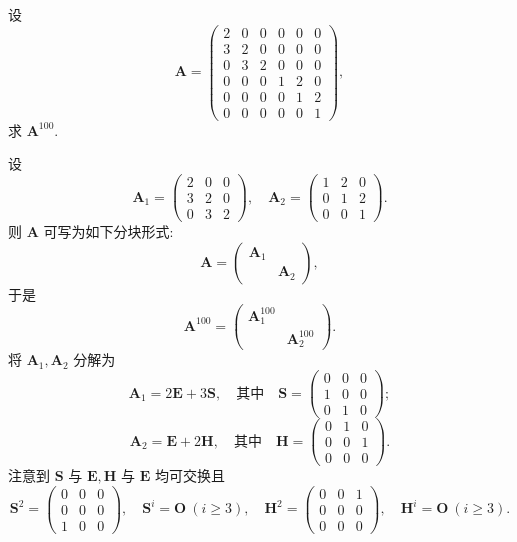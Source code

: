 \documentclass[../../main.tex]{subfiles}
\begin{document}
\begin{example}
设
\[
\boldsymbol{A} = \begin{pmatrix} 2 & 0 & 0 & 0 & 0 & 0 \\ 3 & 2 & 0 & 0 & 0 & 0 \\ 0 & 3 & 2 & 0 & 0 & 0 \\ 0 & 0 & 0 & 1 & 2 & 0 \\ 0 & 0 & 0 & 0 & 1 & 2 \\ 0 & 0 & 0 & 0 & 0 & 1 \end{pmatrix},
\]
求 \(\boldsymbol{A}^{100}\).
\end{example}
\begin{solution}
设
\[
\boldsymbol{A}_1 = \begin{pmatrix} 2 & 0 & 0 \\ 3 & 2 & 0 \\ 0 & 3 & 2 \end{pmatrix}, \quad \boldsymbol{A}_2 = \begin{pmatrix} 1 & 2 & 0 \\ 0 & 1 & 2 \\ 0 & 0 & 1 \end{pmatrix}.
\]
则 \(\boldsymbol{A}\) 可写为如下分块形式:
\[
\boldsymbol{A} = \begin{pmatrix} \boldsymbol{A}_1 &  \\  & \boldsymbol{A}_2 \end{pmatrix},
\]
于是
\[
\boldsymbol{A}^{100} = \begin{pmatrix} \boldsymbol{A}_1^{100} &  \\  & \boldsymbol{A}_2^{100} \end{pmatrix}.
\]
将 \(\boldsymbol{A}_1, \boldsymbol{A}_2\) 分解为
\[
\boldsymbol{A}_1 = 2\boldsymbol{E} + 3\boldsymbol{S}, \quad \text{其中} \quad \boldsymbol{S} = \begin{pmatrix} 0 & 0 & 0 \\ 1 & 0 & 0 \\ 0 & 1 & 0 \end{pmatrix};
\]
\[
\boldsymbol{A}_2 = \boldsymbol{E} + 2\boldsymbol{H}, \quad \text{其中} \quad \boldsymbol{H} = \begin{pmatrix} 0 & 1 & 0 \\ 0 & 0 & 1 \\ 0 & 0 & 0 \end{pmatrix}.
\]
注意到 \(\boldsymbol{S}\) 与 \(\boldsymbol{E}, \boldsymbol{H}\) 与 \(\boldsymbol{E}\) 均可交换且
\[
\boldsymbol{S}^2 = \begin{pmatrix} 0 & 0 & 0 \\ 0 & 0 & 0 \\ 1 & 0 & 0 \end{pmatrix}, \quad \boldsymbol{S}^i = \boldsymbol{O} \ (i \geqslant 3), \quad \boldsymbol{H}^2 = \begin{pmatrix} 0 & 0 & 1 \\ 0 & 0 & 0 \\ 0 & 0 & 0 \end{pmatrix}, \quad \boldsymbol{H}^i = \boldsymbol{O} \ (i \geqslant 3).
\]
\end{solution}
\end{document}
